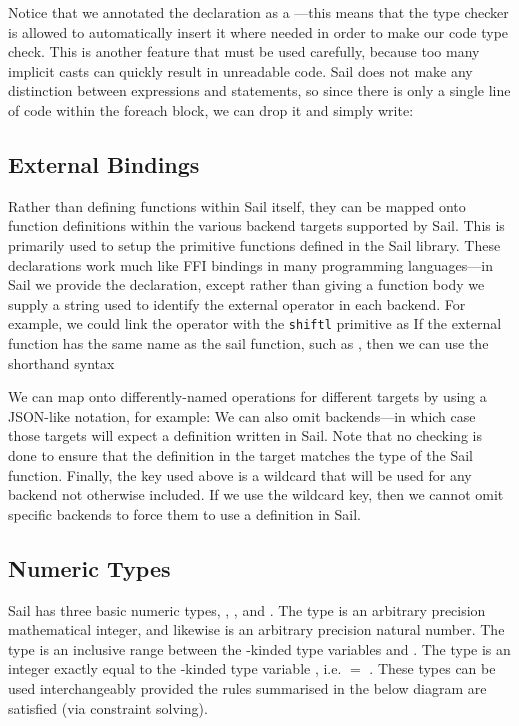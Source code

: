 Notice that we annotated the  declaration as a
---this means that the type checker is allowed to
automatically insert it where needed in order to make our code type
check. This is another feature that must be used carefully, because
too many implicit casts can quickly result in unreadable code. Sail
does not make any distinction between expressions and statements, so
since there is only a single line of code within the foreach block, we
can drop it and simply write: \mrbfnmyreplicatebitsthree

\subsection{External Bindings}

Rather than defining functions within Sail itself, they can be mapped
onto function definitions within the various backend targets supported
by Sail. This is primarily used to setup the primitive functions
defined in the Sail library. These declarations work much like FFI
bindings in many programming languages---in Sail we provide the
 declaration, except rather than giving a function body we
supply a string used to identify the external operator in each
backend. For example, we could link the \ll{<<} operator with the
\verb|shiftl| primitive as \mrbzeightoperatorzzerozIzIznine If the
external function has the same name as the sail function, such as
, then we can use the shorthand syntax
\mrbshiftl

We can map onto differently-named operations for different targets by
using a JSON-like  notation, for example:
\mrbzeightoperatorzzerozKzKznine We can also omit backends---in which
case those targets will expect a definition written in Sail. Note that
no checking is done to ensure that the definition in the target
matches the type of the Sail function. Finally, the \ll{_} key used
above is a wildcard that will be used for any backend not otherwise
included. If we use the wildcard key, then we cannot omit specific
backends to force them to use a definition in Sail.

\subsection{Numeric Types}
\label{sec:numeric}

Sail has three basic numeric types, , , and
. The type  is an arbitrary precision mathematical
integer, and likewise  is an arbitrary precision natural
number. The type  is an inclusive range between the
-kinded type variables  and . The type
 is an integer exactly equal to the -kinded type
variable , i.e.  $=$ . These types
can be used interchangeably provided the rules summarised in the below
diagram are satisfied (via constraint solving).

